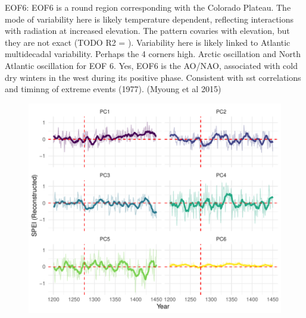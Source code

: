 \documentclass[11pt]{wlscirep}
\begin{document}
EOF6:
EOF6 is a round region corresponding with the Colorado Plateau. The mode of variability here is likely temperature dependent, reflecting interactions with radiation at increased elevation. The pattern covaries with elevation, but they are not exact (TODO R2 = ). Variability here is likely linked to Atlantic multidecadal variability. Perhaps the 4 corners high.
Arctic oscillation and North Atlantic oscillation for EOF 6. Yes, EOF6 is the AO/NAO, associated with cold dry winters in the west during its positive phase. Consistent with sst correlations and timinng of extreme events (1977). (Myoung et al 2015)





\begin{figure}[!ht]
\centering
\includegraphics[width=\linewidth]{figures/spei_reconstruction.pdf}
\caption{}
\label{fig:spei-reconstruction}
\end{figure}
\end{document}

